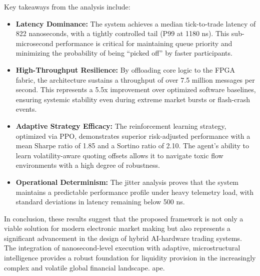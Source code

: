 Key takeaways from the analysis include:
\begin{itemize}
    \item \textbf{Latency Dominance:} The system achieves a median tick-to-trade latency of 822 nanoseconds, with a tightly controlled tail (P99 at 1180 ns). This sub-microsecond performance is critical for maintaining queue priority and minimizing the probability of being ``picked off'' by faster participants.
    \item \textbf{High-Throughput Resilience:} By offloading core logic to the FPGA fabric, the architecture sustains a throughput of over 7.5 million messages per second. This represents a 5.5x improvement over optimized software baselines, ensuring systemic stability even during extreme market bursts or flash-crash events.
    \item \textbf{Adaptive Strategy Efficacy:} The reinforcement learning strategy, optimized via PPO, demonstrates superior risk-adjusted performance with a mean Sharpe ratio of 1.85 and a Sortino ratio of 2.10. The agent's ability to learn volatility-aware quoting offsets allows it to navigate toxic flow environments with a high degree of robustness.
    \item \textbf{Operational Determinism:} The jitter analysis proves that the system maintains a predictable performance profile under heavy telemetry load, with standard deviations in latency remaining below 500 ns.
\end{itemize}

In conclusion, these results suggest that the proposed framework is not only a viable solution for modern electronic market making but also represents a significant advancement in the design of hybrid AI-hardware trading systems. The integration of nanosecond-level execution with adaptive, microstructural intelligence provides a robust foundation for liquidity provision in the increasingly complex and volatile global financial landscape.
ape.
